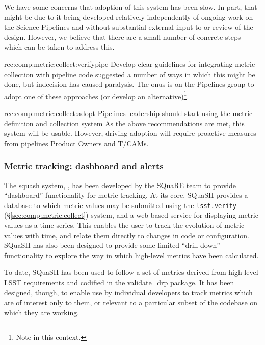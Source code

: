 We have some concerns that adoption of this system has been slow.
In part, that might be due to it being developed relatively independently of ongoing work on the Science Pipelines and without substantial external input to or review of the design.
However, we believe that there are a small number of concrete steps which can be taken to address this.

\begin{recommendation}
    {rec:comp:metric:collect:verifypipe}
    {Develop clear guidelines for integrating metric collection with pipeline code}
     suggested a number of ways in which this might be done, but indecision has caused paralysis.
    The onus is on the Pipelines group to adopt one of these approaches (or develop an alternative)\footnote{Note  in this context.}.
\end{recommendation}

\begin{recommendation}
    {rec:comp:metric:collect:adopt}
    {Pipelines leadership should start using the metric definition and collection system}
    As the above recommendations are met, this system will be usable.
    However, driving adoption will require proactive measures from pipelines Product Owners and T/CAMs.
\end{recommendation}

\subsubsection{Metric tracking: dashboard and alerts}
\label{sec:comp:metric:dashboard}

The \gls{squash} system, , has been developed by the SQuaRE team to provide ``\gls{dashboard}'' functionality for metric tracking.
At its core, SQuaSH provides a database to which metric values may be submitted using the \texttt{lsst.verify} (\S\ref{sec:comp:metric:collect}) system, and a web-based service for displaying metric values as a time series.
This enables the user to track the evolution of metric values with time, and relate them directly to changes in code or configuration.
SQuaSH has also been designed to provide some limited ``drill-down'' functionality to explore the way in which high-level metrics have been calculated.

To date, SQuaSH has been used to follow a set of metrics derived from high-level LSST requirements and codified in the validate\_drp package.
It has been designed, though, to enable use by individual developers to track metrics which are of interest only to them, or relevant to a particular subset of the codebase on which they are working.

